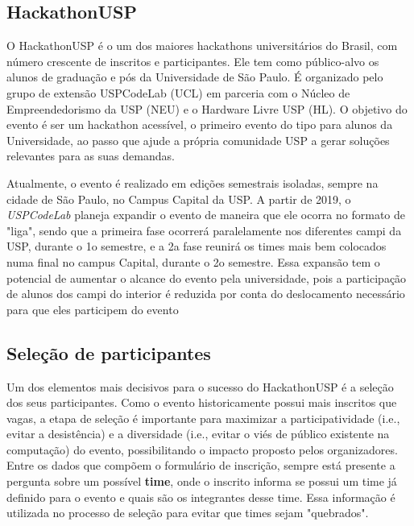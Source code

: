 \documentclass[10pt,twoside,a4paper]{article}
\begin{document}
  \subsection{HackathonUSP}
    
    O HackathonUSP é o um dos maiores hackathons universitários do Brasil, com número crescente de inscritos e participantes. Ele tem como  público-alvo os alunos de graduação e pós da Universidade de São Paulo. É organizado pelo grupo de extensão USPCodeLab (UCL) em parceria com o Núcleo de Empreendedorismo da USP (NEU) e o Hardware Livre USP (HL). O objetivo do evento é ser um hackathon acessível, o primeiro evento do tipo para alunos da Universidade, ao passo que ajude a própria comunidade USP a gerar soluções relevantes para as suas demandas.
    
    Atualmente, o evento é realizado em edições semestrais isoladas, sempre na cidade de São Paulo, no Campus Capital da USP. A partir de 2019, o \textit{USPCodeLab} planeja expandir o evento de maneira que ele ocorra no formato de "liga", sendo que a primeira fase ocorrerá paralelamente nos diferentes campi da USP, durante o 1o semestre, e a 2a fase reunirá os times mais bem colocados numa final no campus Capital, durante o 2o semestre. Essa expansão tem o potencial de aumentar o alcance do evento pela universidade, pois a participação de alunos dos campi do interior é reduzida por conta do deslocamento necessário para que eles participem do evento
    
  \subsection{Seleção de participantes}
    
    Um dos elementos mais decisivos para o sucesso do HackathonUSP é a seleção dos seus participantes. Como o evento historicamente possui mais inscritos que vagas, a etapa de seleção é importante para maximizar a participatividade (i.e., evitar a desistência) e a diversidade (i.e., evitar o viés de público existente na computação) do evento, possibilitando o impacto proposto pelos organizadores. Entre os dados que compõem o formulário de inscrição, sempre está presente a pergunta sobre um possível \textbf{time}, onde o inscrito informa se possui um time já definido para o evento e quais são os integrantes desse time. Essa informação é utilizada no processo de seleção para evitar que times sejam "quebrados".
    
\end{document}
